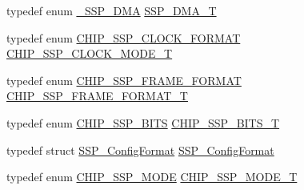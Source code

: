 \begin{DoxyCompactItemize}
\item 
typedef enum \hyperlink{group__SSP__17XX__40XX_gaee679ef8477b8e31bf174e66e2984caf}{\-\_\-\-S\-S\-P\-\_\-\-D\-M\-A} \hyperlink{group__SSP__17XX__40XX_ga026212e0116f9a1109fd221e6b0ac503}{S\-S\-P\-\_\-\-D\-M\-A\-\_\-\-T}
\item 
typedef enum \hyperlink{group__SSP__17XX__40XX_gab423240914ad746147aeb31f483e9553}{C\-H\-I\-P\-\_\-\-S\-S\-P\-\_\-\-C\-L\-O\-C\-K\-\_\-\-F\-O\-R\-M\-A\-T} \hyperlink{group__SSP__17XX__40XX_ga12dec81e345a9ffbefd6a1fae5759e09}{C\-H\-I\-P\-\_\-\-S\-S\-P\-\_\-\-C\-L\-O\-C\-K\-\_\-\-M\-O\-D\-E\-\_\-\-T}
\item 
typedef enum \hyperlink{group__SSP__17XX__40XX_gad3ae555ad43caa2b2a47bc4769d8fe50}{C\-H\-I\-P\-\_\-\-S\-S\-P\-\_\-\-F\-R\-A\-M\-E\-\_\-\-F\-O\-R\-M\-A\-T} \hyperlink{group__SSP__17XX__40XX_ga207687847d9ab8385057ddeca53c2942}{C\-H\-I\-P\-\_\-\-S\-S\-P\-\_\-\-F\-R\-A\-M\-E\-\_\-\-F\-O\-R\-M\-A\-T\-\_\-\-T}
\item 
typedef enum \hyperlink{group__SSP__17XX__40XX_ga2f99e08511788c146ae9b35023e4a61c}{C\-H\-I\-P\-\_\-\-S\-S\-P\-\_\-\-B\-I\-T\-S} \hyperlink{group__SSP__17XX__40XX_ga4e348748c4fb42ef94c2cbd968a43648}{C\-H\-I\-P\-\_\-\-S\-S\-P\-\_\-\-B\-I\-T\-S\-\_\-\-T}
\item 
typedef struct \hyperlink{structSSP__ConfigFormat}{S\-S\-P\-\_\-\-Config\-Format} \hyperlink{group__SSP__17XX__40XX_ga0c59381b3e253fe86244ec98a53a7d79}{S\-S\-P\-\_\-\-Config\-Format}
\item 
typedef enum \hyperlink{group__SSP__17XX__40XX_ga2a375ed10848e3661b9b015fea1cf39b}{C\-H\-I\-P\-\_\-\-S\-S\-P\-\_\-\-M\-O\-D\-E} \hyperlink{group__SSP__17XX__40XX_gaced971159acfb5b4f06caa5b02f5a680}{C\-H\-I\-P\-\_\-\-S\-S\-P\-\_\-\-M\-O\-D\-E\-\_\-\-T}
\end{DoxyCompactItemize}
